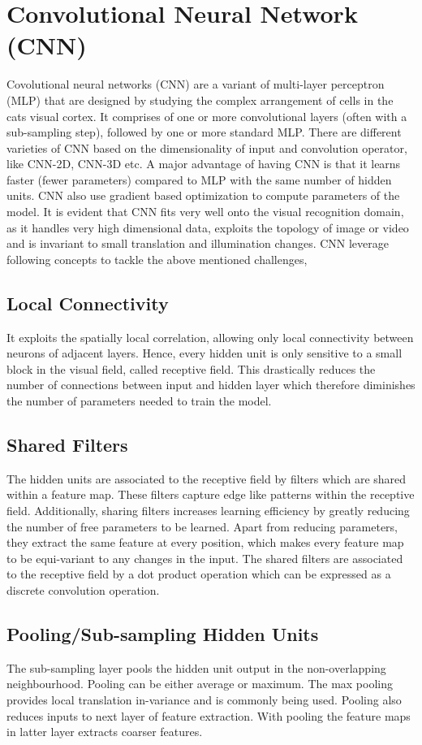 \section{Convolutional Neural Network (CNN)}
 \label{sec:cnn}
 \par Covolutional neural networks (CNN) are a variant of multi-layer perceptron (MLP) that are designed by studying the complex arrangement of cells in the cats visual cortex.  It comprises of one or more convolutional layers (often with a sub-sampling step), followed by one or more standard MLP.  There are different varieties of CNN based on the dimensionality of input and convolution operator, like CNN-2D, CNN-3D etc.  A major advantage of having CNN is that it learns faster (fewer parameters) compared to MLP with the same number of hidden units.  CNN  also use  gradient based optimization to compute parameters of the model. It is  evident that CNN fits very well onto the visual recognition domain, as it handles very high dimensional data, exploits the topology of image or video and is invariant to small translation and illumination changes.  CNN leverage following concepts to tackle the above mentioned challenges,
\subsection{Local Connectivity}
It exploits the spatially local correlation, allowing only local connectivity between neurons of adjacent layers.  Hence, every hidden unit is only sensitive to a small block in the visual field, called receptive field. This drastically reduces the number of connections between input and hidden layer which therefore diminishes the number of parameters needed to train the model.
\subsection{Shared Filters}
The hidden units are associated to the receptive field by filters which are shared within a feature map. These filters capture edge like patterns within the receptive field.  Additionally, sharing filters increases learning efficiency by greatly reducing the number of free parameters to be learned.  Apart from reducing parameters, they extract the same feature at every position, which makes every feature map to be equi-variant to any changes in the input.  The shared filters are associated to the receptive field by a dot product operation which can be expressed as a discrete convolution operation.
\subsection{Pooling/Sub-sampling Hidden Units}
The sub-sampling layer pools the hidden unit output in the non-overlapping neighbourhood.  Pooling can be either average or maximum.  The max pooling provides local translation in-variance and is commonly being used.  Pooling also reduces inputs to next layer of feature extraction.  With pooling the feature maps in latter layer extracts coarser features.

